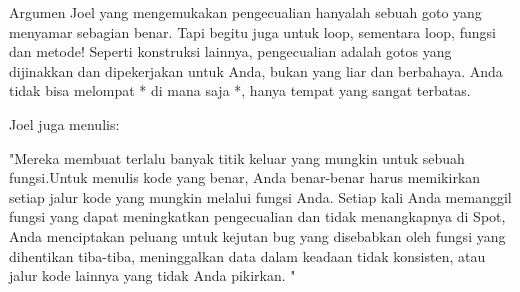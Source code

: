 \documentclass[a4paper,12pt]{report}
\begin{document}
\noindent 
Argumen Joel yang mengemukakan pengecualian hanyalah sebuah goto yang menyamar sebagian benar. Tapi begitu juga untuk loop, sementara loop, fungsi dan metode! Seperti konstruksi lainnya, pengecualian adalah gotos yang dijinakkan dan dipekerjakan untuk Anda, bukan yang liar dan berbahaya. Anda tidak bisa melompat * di mana saja *, hanya tempat yang sangat terbatas. \par
\noindent 
\vspace{12pt}
\noindent 
Joel juga menulis: \par
\noindent 
\vspace{12pt}
\noindent 
"Mereka membuat terlalu banyak titik keluar yang mungkin untuk sebuah fungsi.Untuk menulis kode yang benar, Anda benar-benar harus memikirkan setiap jalur kode yang mungkin melalui fungsi Anda. Setiap kali Anda memanggil fungsi yang dapat meningkatkan pengecualian dan tidak menangkapnya di Spot, Anda menciptakan peluang untuk kejutan bug yang disebabkan oleh fungsi yang dihentikan tiba-tiba, meninggalkan data dalam keadaan tidak konsisten, atau jalur kode lainnya yang tidak Anda pikirkan. " \par
\noindent 
\vspace{12pt}
\noindent 
\vspace{10pt}
\vspace{16pt}
\end{document}

